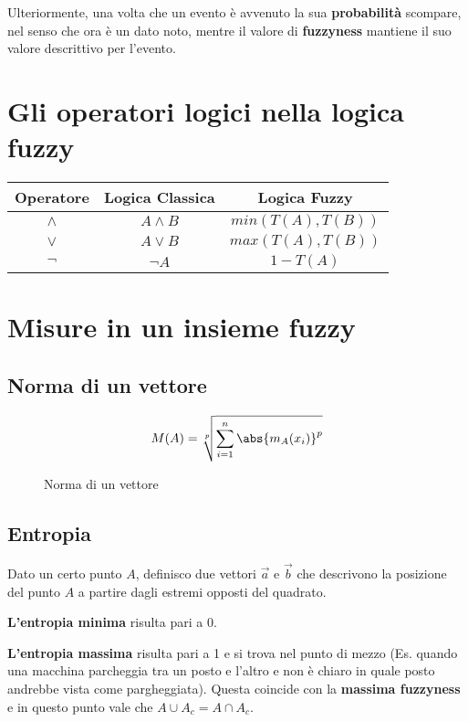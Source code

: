 \documentclass[\main/main.tex]{subfiles}
\begin{document}
Ulteriormente, una volta che un evento è avvenuto la sua \textbf{probabilità} scompare, nel senso che ora è un dato noto, mentre il valore di \textbf{fuzzyness} mantiene il suo valore descrittivo per l'evento.

\section{Gli operatori logici nella logica fuzzy}

\begin{center}
\begin{tabular}{ |c|c|c| } 
 \hline
 Operatore & Logica Classica & Logica Fuzzy \\ 
 \hline
 $\wedge$ & $A \wedge B$ & $min(T(A), T(B))$ \\ 
 \hline
 $\vee$ & $A \vee B$ & $max(T(A), T(B))$ \\ 
 \hline
$ \neg$ & $\neg A$ & $1 - T(A)$ \\ 
 \hline
\end{tabular}
\end{center}

\section{Misure in un insieme fuzzy}

\subsection{Norma di un vettore}

\begin{figure}[H]
	\[
	M(A) = \sqrt[p]{\sum_{i=1}^{n} \abs{m_A(x_i)}^p}
	\]
	\caption{Norma di un vettore}
\end{figure}

\subsection{Entropia}
Dato un certo punto $A$, definisco due vettori $\vec{a}$ e $\vec{b}$ che descrivono la posizione del punto $A$ a partire dagli estremi opposti del quadrato.

\textbf{L'entropia minima} risulta pari a 0.

\textbf{L'entropia massima} risulta pari a 1 e si trova nel punto di mezzo (Es. quando una macchina parcheggia tra un posto e l'altro e non è chiaro in quale posto andrebbe vista come pargheggiata). Questa coincide con la \textbf{massima fuzzyness} e in questo punto vale che $A \cup A_c = A \cap A_c$.
\end{document}
